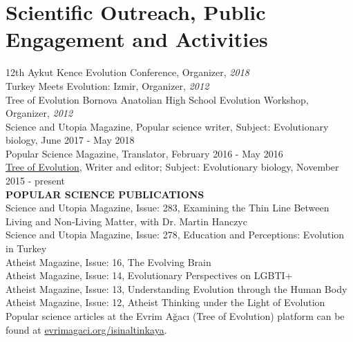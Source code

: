 \documentclass[letterpaper,10.5pt]{article}
\begin{document}
\section{Scientific Outreach, Public Engagement and Activities}
12th Aykut Kence Evolution Conference, Organizer, \textit{2018} \\
Turkey Meets Evolution: Izmir, Organizer, \textit{2012} \\
Tree of Evolution Bornova Anatolian High School Evolution Workshop, Organizer, \textit{2012} \\
Science and Utopia Magazine, Popular science writer, Subject: Evolutionary biology, June 2017 - May 2018 \\
Popular Science Magazine, Translator, February 2016 - May 2016 \\
\href{https://evrimagaci.org/isinaltinkaya/}{Tree of Evolution}, Writer and editor; Subject: Evolutionary biology, November 2015 - present \\
\medskip
\textbf{POPULAR SCIENCE PUBLICATIONS} \\
Science and Utopia Magazine, Issue: 283, Examining the Thin Line Between Living and Non-Living Matter, with Dr. Martin Hanczyc \\
Science and Utopia Magazine, Issue: 278, Education and Perceptions: Evolution in Turkey \\
Atheist Magazine, Issue: 16, The Evolving Brain \\
Atheist Magazine, Issue: 14, Evolutionary Perspectives on LGBTI+ \\
Atheist Magazine, Issue: 13, Understanding Evolution through the Human Body \\
Atheist Magazine, Issue: 12, Atheist Thinking under the Light of Evolution \\
Popular science articles at the Evrim A\u{g}ac{\i} (Tree of Evolution) platform can be found at  \href{https://evrimagaci.org/isinaltinkaya/}{evrimagaci.org/isinaltinkaya}. 




\end{document}
